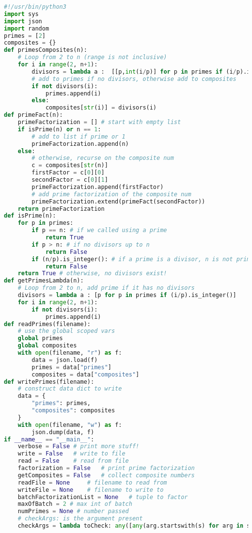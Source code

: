 \documentclass[12pt, twoside, reqno]{book}
\begin{document}
\begin{lstlisting}[language=Python]
#!/usr/bin/python3
import sys
import json
import random
primes = [2]
composites = {}
def primesComposites(n):
    # Loop from 2 to n (range is not inclusive)
    for i in range(2, n+1):
        divisors = lambda a :  [[p,int(i/p)] for p in primes if (i/p).is_integer()]
        # add to primes if no divisors, otherwise add to composites
        if not divisors(i):
            primes.append(i)
        else:
            composites[str(i)] = divisors(i)
def primeFact(n):
    primeFactorization = [] # start with empty list
    if isPrime(n) or n == 1:
        # add to list if prime or 1
        primeFactorization.append(n)
    else:
        # otherwise, recurse on the composite num
        c = composites[str(n)]
        firstFactor = c[0][0]
        secondFactor = c[0][1]
        primeFactorization.append(firstFactor)
        # add prime factorization of the composite num
        primeFactorization.extend(primeFact(secondFactor))
    return primeFactorization
def isPrime(n):
    for p in primes:
        if p == n: # if we called using a prime
            return True
        if p > n: # if no divisors up to n
            return False
        if (n/p).is_integer(): # if a prime is a divisor, n is not prime
            return False
    return True # otherwise, no divisors exist!
def getPrimesLambda(n):
    # Loop from 2 to n, add prime if it has no divisors
    divisors = lambda a : [p for p in primes if (i/p).is_integer()]
    for i in range(2, n+1):
        if not divisors(i):
            primes.append(i)
def readPrimes(filename):
    # use the global scoped vars
    global primes
    global composites
    with open(filename, "r") as f:
        data = json.load(f)
        primes = data["primes"]
        composites = data["composites"]
def writePrimes(filename):
    # construct data dict to write
    data = {
        "primes": primes,
        "composites": composites
    }
    with open(filename, "w") as f:
        json.dump(data, f)
if __name__ == "__main__":
    verbose = False # print more stuff!
    write = False   # write to file
    read = False    # read from file
    factorization = False   # print prime factorization
    getComposites = False   # collect composite numbers
    readFile = None     # filename to read from
    writeFile = None    # filename to write to
    batchFactorizationList = None   # tuple to factor
    maxOfBatch = 2 # max int of batch
    numPrimes = None # number passed
    # checkArgs: is the argument present
    checkArgs = lambda toCheck: any([any(arg.startswith(s) for arg in sys.argv) for s in toCheck])

\end{lstlisting}
\end{document}
